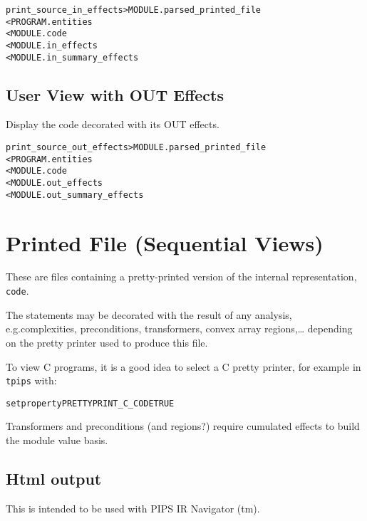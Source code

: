 \documentclass[a4paper]{report}
\newenvironment{PipsMake}{\begin{alltt}}{\end{alltt}}
\newenvironment{PipsPass}[1]{\label{pass:#1}}{}
\begin{document}
\begin{PipsMake}
print_source_in_effects       > MODULE.parsed_printed_file
        < PROGRAM.entities
        < MODULE.code
        < MODULE.in_effects
        < MODULE.in_summary_effects
\end{PipsMake}

\subsection{User View with OUT Effects}
\begin{PipsPass}{print_source_out_effects}
Display the code decorated with its OUT effects.
\end{PipsPass}

\begin{PipsMake}
print_source_out_effects       > MODULE.parsed_printed_file
        < PROGRAM.entities
        < MODULE.code
        < MODULE.out_effects
        < MODULE.out_summary_effects
\end{PipsMake}



\section{Printed File (Sequential Views)}


\begin{PipsPass}{printed_file}
These are files containing a pretty-printed version of the internal
representation, \verb+code+.

The statements may be decorated with the result of any analysis,
e.g.complexities, preconditions, transformers, convex array regions,\ldots{} depending on
the pretty printer used to produce this file.

To view C programs, it is a good idea to select a C pretty printer, for
example in \texttt{tpips} with:
\begin{alltt}
setproperty PRETTYPRINT_C_CODE TRUE
\end{alltt}

Transformers and preconditions (and regions?) require cumulated effects
to build the module value basis.
\end{PipsPass}



\subsection{Html output}

This is intended to be used with PIPS IR Navigator (tm).
\end{document}
